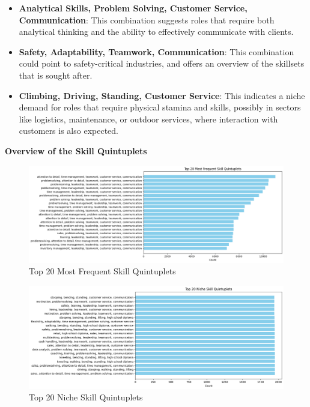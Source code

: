 \documentclass{article}
\begin{document}
\begin{itemize}
    \item \textbf{Analytical Skills, Problem Solving, Customer Service, Communication}: 
    This combination suggests roles that require both analytical thinking and the ability to effectively communicate with clients.

    \item \textbf{Safety, Adaptability, Teamwork, Communication}: 
    This combination could point to safety-critical industries, and offers an overview of the skillsets that is sought after.

    \item \textbf{Climbing, Driving, Standing, Customer Service}: 
    This indicates a niche demand for roles that require physical stamina and skills, possibly in sectors like logistics, maintenance, or outdoor services, where interaction with customers is also expected.
\end{itemize}

\vspace{0.5cm}
\textbf{Overview of the Skill Quintuplets}

\vspace{0.3cm}
\begin{figure}[H]
    \centering
    \includegraphics[width=1\linewidth]{download (30).png}
    \caption{Top 20 Most Frequent Skill Quintuplets}
    \label{fig:skill_pairs_1}
\end{figure}

\vspace{0.3cm}
\begin{figure}[H]
    \centering
    \includegraphics[width=1\linewidth]{download (31).png}
    \caption{Top 20 Niche Skill Quintuplets}
    \label{fig:skill_pairs_2}
\end{figure}
\end{document}
